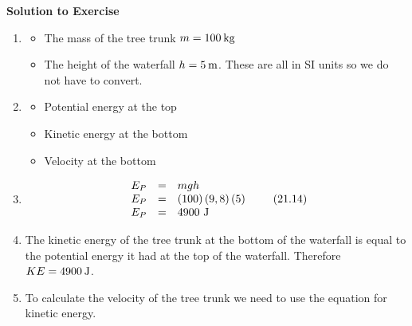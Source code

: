 {\begin{mdframed}[linewidth=4, leftmargin=40, rightmargin=40]
\begin{exercise}
        \par 
        \vspace{5pt}
        \label{m38786*solfhsst!!!underscore!!!id1919}\noindent\textbf{Solution to Exercise } \label{m38786*listfhsst!!!underscore!!!id1919}\begin{enumerate}[noitemsep, label=\textbf{Step} \textbf{\arabic*}. ] 
            \leftskip=20pt\rightskip=\leftskip\item  
        \label{m38786*id69257}\begin{itemize}[noitemsep]
            \leftskip=20pt\rightskip=\leftskip\label{m38786*uid83}\item The mass of the tree trunk $m=100\phantom{\rule{2pt}{0ex}}\mathrm{kg}$
\label{m38786*uid84}\item The height of the waterfall $h=5\phantom{\rule{2pt}{0ex}}\mathrm{m}$.
These are all in SI units so we do not have to convert.
\end{itemize}
        \item  
        \label{m38786*id69314}\begin{itemize}[noitemsep]
            \leftskip=20pt\rightskip=\leftskip\label{m38786*uid85}\item Potential energy at the top
\label{m38786*uid86}\item Kinetic energy at the bottom
\label{m38786*uid87}\item Velocity at the bottom
\end{itemize}
        \item  
        \label{m38786*id69358}\nopagebreak\noindent{}
    \begin{equation}
    \begin{array}{ccc}\hfill {E}_{P}& =& mgh\hfill \\ \hfill {E}_{P}& =& \left(100\right)\left(9,8\right)\left(5\right)\hfill \\ \hfill {E}_{P}& =& 4900\phantom{\rule{3.33333pt}{0ex}}\mathrm{J}\hfill \end{array}\tag{21.14}
      \end{equation}
        \item  
        \label{m38786*id69467}The kinetic energy of the tree trunk at the bottom of the waterfall is equal to the potential energy it had at the top of the waterfall. Therefore $KE=4 900\phantom{\rule{2pt}{0ex}}\mathrm{J}$.\par 
        \item  
        \label{m38786*id69490}To calculate the velocity of the tree trunk we need to use the equation for kinetic energy.\par 

\end{enumerate}
\end{exercise}
\end{mdframed}}
